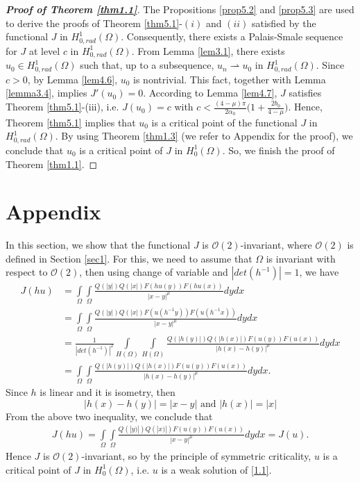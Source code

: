 \documentclass[11pt]{amsart}
\numberwithin{equation}{section}
\newcommand{\h}{H^1_0(\Omega)}
\newcommand{\hr}{H^1_{0, rad}(\Omega)}
\newcommand{\1}{\frac{1}{2}}
\begin{document}
	\begin{proof}[\bf Proof of Theorem \ref{thm1.1}] The Propositions \ref{prop5.2} and \ref{prop5.3} are used to derive the proofs of Theorem \ref{thm5.1}-$(i)$ and $(ii)$ satisfied by the functional $J$ in $\hr$. Consequently, there exists a Palais-Smale sequence for $J$ at level $c$ in $\hr$. From Lemma \ref{lem3.1}, there exists $u_0 \in \hr$ such that, up to a subsequence, $u_n \rightharpoonup u_0$ in $\hr$. Since $c>0$, by Lemma \ref{lem4.6}, $u_0$ is nontrivial. This fact, together with Lemma \ref{lemma3.4}, implies $J'(u_0)=0$. According to Lemma \ref{lem4.7}, $J$ satisfies Theorem \ref{thm5.1}-(iii), i.e. $J(u_0)=c$ with $c < \frac{(4-\mu)\pi}{2\alpha_0}\Big( 1+\frac{2b_0}{4-\mu}\Big)$. Hence, Theorem \ref{thm5.1} implies that $u_0$ is a critical point of the functional $J$ in $\hr$. By using Theorem \ref{thm1.3} (we refer to Appendix for the proof), we conclude that $u_0$ is a critical point of $J$ in $\h$. So, we finish the proof of Theorem \ref{thm1.1}.
	\end{proof}
	\section*{Appendix}
	In this section, we show that the functional $J$ is $\mathcal{O}(2)$-invariant, where $\mathcal{O}(2)$ is defined in Section \ref{sec1}. For this, we need to assume that $\Omega$ is invariant with respect to $\mathcal{O}(2)$, then using change of variable and $|det (h^{-1})|=1$, we have
	\begin{align*}
		J(hu)  & = \int\limits_\Omega \int\limits_\Omega \frac{ Q(|y|) Q(|x|) F(hu(y)) F(hu(x))}{|x-y|^\mu}dy dx\\
		&=\int\limits_\Omega \int\limits_\Omega \frac{ Q(|y|) Q(|x|) F(u(h^{-1}y)) F(u(h^{-1}x))}{|x-y|^\mu}dy dx\\
		&= \frac{1}{|det (h^{-1})|^2} \int\limits_{H(\Omega)} \int\limits_{H(\Omega)} \frac{ Q(|h(y)|) Q(|h(x)|) F(u(y)) F(u(x))}{|h(x)-h(y)|^\mu}dy dx\\
		&=\int\limits_{\Omega} \int\limits_{\Omega} \frac{ Q(|h(y)|) Q(|h(x)|) F(u(y)) F(u(x))}{|h(x)-h(y)|^\mu}dy dx.
	\end{align*}
	Since $h$ is linear and it is isometry, then
	\[ |h(x)-h(y)|= |x-y| \text{ and } |h(x)| = |x|\]
	From the above two inequality, we conclude that 
	\begin{align*}
		J(hu) =\int\limits_{\Omega} \int\limits_{\Omega} \frac{ Q(|y)|) Q(|x)|) F(u(y)) F(u(x))}{|x-y|^\mu}dy dx = J(u).
	\end{align*}
	Hence $J$ is $\mathcal{O}(2)$-invariant, so by the principle of symmetric criticality, $u$ is a critical point of $J$ in $\h$, i.e. $u$ is a weak solution of \eqref{1.1}.
	
\end{document}
